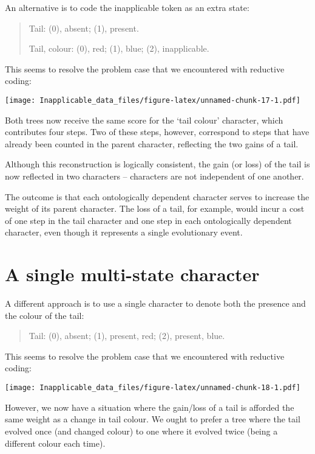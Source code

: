 \documentclass[]{book}
\theoremstyle{definition}
\theoremstyle{definition}
\theoremstyle{definition}
\theoremstyle{remark}
\begin{document}
An alternative is to code the inapplicable token as an extra state:

\begin{quote}
Tail: (0), absent; (1), present.

Tail, colour: (0), red; (1), blue; (2), inapplicable.
\end{quote}

This seems to resolve the problem case that we encountered with
reductive coding:

\texttt{[image: Inapplicable\_data\_files/figure-latex/unnamed-chunk-17-1.pdf]}

Both trees now receive the same score for the `tail colour' character,
which contributes four steps. Two of these steps, however, correspond to
steps that have already been counted in the parent character, reflecting
the two gains of a tail.

Although this reconstruction is logically consistent, the gain (or loss)
of the tail is now reflected in two characters -- characters are not
independent of one another.

The outcome is that each ontologically dependent character serves to
increase the weight of its parent character. The loss of a tail, for
example, would incur a cost of one step in the tail character and one
step in each ontologically dependent character, even though it
represents a single evolutionary event.

\section{A single multi-state
character}\label{a-single-multi-state-character}

A different approach is to use a single character to denote both the
presence and the colour of the tail:

\begin{quote}
Tail: (0), absent; (1), present, red; (2), present, blue.
\end{quote}

This seems to resolve the problem case that we encountered with
reductive coding:

\texttt{[image: Inapplicable\_data\_files/figure-latex/unnamed-chunk-18-1.pdf]}

However, we now have a situation where the gain/loss of a tail is
afforded the same weight as a change in tail colour. We ought to prefer
a tree where the tail evolved once (and changed colour) to one where it
evolved twice (being a different colour each time).
\end{document}
